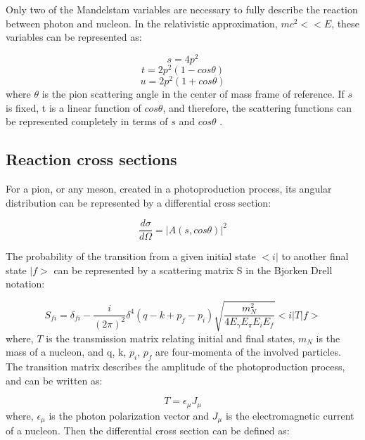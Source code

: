 \indent Only two of the Mandelstam variables are necessary to fully describe the reaction between photon and nucleon. In the relativistic approximation, $mc^{2}<<E$, these variables can be represented as:

\begin{equation}
s=4p^{2}
\end{equation}
\begin{equation}
t=2p^{2}(1-cos\theta)
\end{equation}
\begin{equation}
u=2p^{2}(1+cos\theta)
\end{equation}
where $\theta$ is the pion scattering angle in the center of mass frame of reference. If $s$ is fixed, t is a linear function of $cos\theta$, and therefore, the scattering functions can be represented completely in terms of $s$ and $cos\theta$ \cite{bertulani}.

\subsection{Reaction cross sections}

\indent For a pion, or any meson, created in a photoproduction process, its angular distribution can be represented by a differential cross section:

\begin{equation}
\frac{d\sigma}{d\Omega}=|A(s,cos\theta)|^{2}
\end{equation}

\indent The probability of the transition from a given initial state $<i|$ to another final state $|f>$ can be represented by a scattering matrix S in the Bjorken Drell notation\cite{bjorken}:

\begin{equation}
S_{fi}=\delta_{fi}-\frac{i}{(2\pi)^{2}} \delta^{4}(q-k+p_{f}-p_{i}) \sqrt{\frac{m_{N}^{2}}{4E_{\gamma}E_{\pi}E_{i}E_{f} } } <i|T|f>
\end{equation}
where, $T$ is the transmission matrix relating initial and final states, $m_{N}$ is the mass of a nucleon, and q, k, $p_{i}$, $p_{f}$ are four-momenta of the involved particles. The transition matrix describes the amplitude of the photoproduction process, and can be written as:

\begin{equation}
T=\epsilon_{\mu}J_{\mu}
\end{equation}
where, $\epsilon_{\mu}$ is the photon polarization vector and $J_{\mu}$ is the electromagnetic current of a nucleon. Then the differential cross section can be defined as:


